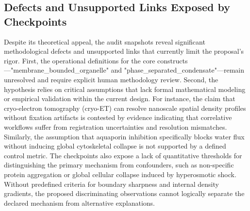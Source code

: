 \documentclass[conference]{IEEEtran}
\begin{document}
\subsection{Defects and Unsupported Links Exposed by Checkpoints}
Despite its theoretical appeal, the audit snapshots reveal significant methodological defects and unsupported links that currently limit the proposal's rigor. First, the operational definitions for the core constructs---"membrane\_bounded\_organelle" and "phase\_separated\_condensate"---remain unresolved and require explicit human methodology review. Second, the hypothesis relies on critical assumptions that lack formal mathematical modeling or empirical validation within the current design. For instance, the claim that cryo-electron tomography (cryo-ET) can resolve nanoscale spatial density profiles without fixation artifacts is contested by evidence indicating that correlative workflows suffer from registration uncertainties and resolution mismatches. Similarly, the assumption that aquaporin inhibition specifically blocks water flux without inducing global cytoskeletal collapse is not supported by a defined control metric. The checkpoints also expose a lack of quantitative thresholds for distinguishing the primary mechanism from confounders, such as non-specific protein aggregation or global cellular collapse induced by hyperosmotic shock. Without predefined criteria for boundary sharpness and internal density gradients, the proposed discriminating observations cannot logically separate the declared mechanism from alternative explanations.~\cite{cite_9ae4c49700eea560,cite_c2d09a021a2238e3}
\end{document}
